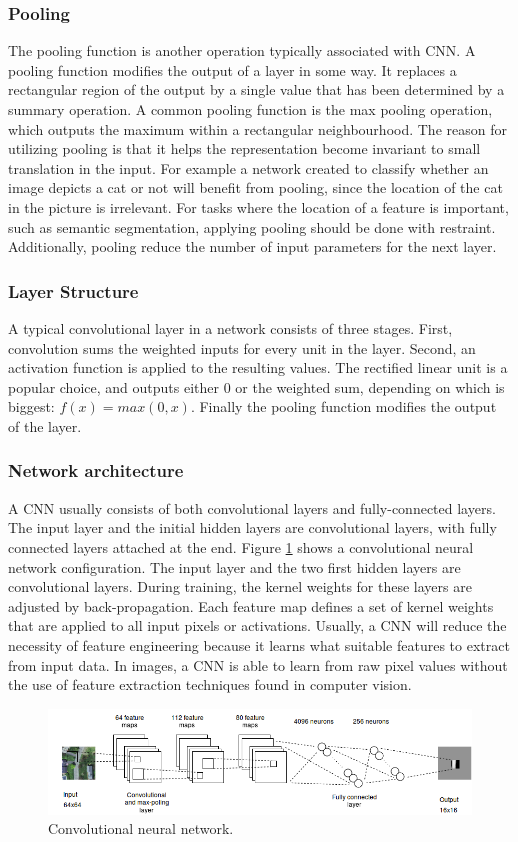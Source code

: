 \subsubsection{Pooling}
The pooling function is another operation typically associated with \ac{CNN}. A pooling function modifies the output of a layer in some way. It replaces a rectangular region of the output by a single value that has been determined by a summary operation. A common pooling function is the max pooling operation, which outputs the maximum within a rectangular neighbourhood. The reason for utilizing pooling is that it helps the representation become invariant to small translation in the input. For example a network created to classify whether an image depicts a cat or not will benefit from pooling, since the location of the cat in the picture is irrelevant. For tasks where the location of a feature is important, such as semantic segmentation, applying pooling should be done with restraint. Additionally, pooling reduce the number of input parameters for the next layer.

\subsubsection{Layer Structure}
A typical convolutional layer in a network consists of three stages. First, convolution sums the weighted inputs for every unit in the layer. Second, an activation function is applied to the resulting values. The rectified linear unit is a popular choice, and outputs either 0 or the weighted sum, depending on which is biggest: $f(x) = max(0, x)$. Finally the pooling function modifies the output of the layer. 

\subsubsection{Network architecture}
A \ac{CNN} usually consists of both convolutional layers and fully-connected layers. The input layer and the initial hidden layers are convolutional layers, with fully connected layers attached at the end. Figure \ref{fig:conv} shows a convolutional neural network configuration. The input layer and the two first hidden layers are convolutional layers. During training, the kernel weights for these layers are adjusted by back-propagation. Each feature map defines a set of kernel weights that are applied to all input pixels or activations. Usually, a \ac{CNN} will reduce the necessity of feature engineering because it learns what suitable features to extract from input data. In images, a \ac{CNN} is able to learn from raw pixel values without the use of feature extraction techniques found in computer vision.


\begin{figure}[t]
\begin{center}
\includegraphics[width=1\columnwidth]{figs/conv_diagram.png}
\caption[Convolutional neural network]{Convolutional neural network. }
\label{fig:conv}
\end{center}
\end{figure}